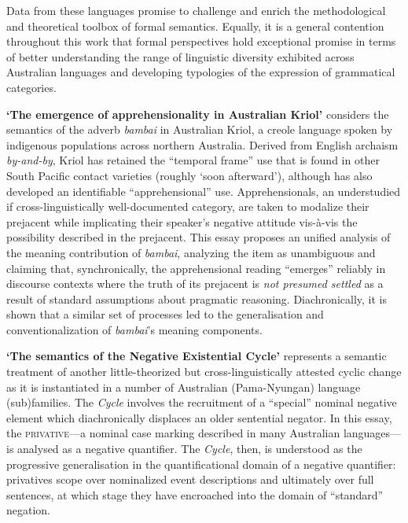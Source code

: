 {Data from these languages promise to challenge and enrich the methodological and theoretical toolbox of formal semantics. Equally, it is a general contention throughout this work that formal perspectives hold exceptional promise in terms of better understanding the range of linguistic diversity exhibited across Australian languages and developing typologies of the expression of grammatical categories.

\textbf{‘The emergence of apprehensionality in Australian Kriol’} considers the semantics of the adverb \textit{bambai} in Australian Kriol, a creole language spoken by indigenous populations across northern Australia. Derived from English archaism \textit{by-and-by}, %
Kriol has retained the ``temporal frame'' use that is found in other South Pacific contact varieties (roughly `soon afterward'), although has also developed an identifiable ``apprehensional'' use. Apprehensionals, an understudied if cross-linguistically well-documented category, are taken to modalize their prejacent while implicating their speaker's negative attitude vis-à-vis the possibility described in the prejacent. This essay proposes an unified analysis of the meaning contribution of \textit{bambai}, analyzing the item as unambiguous and claiming that, synchronically, the apprehensional reading ``emerges'' reliably in discourse contexts where the truth of its prejacent is \textit{not presumed settled} as a result of standard assumptions about pragmatic reasoning. Diachronically, it is shown that a similar set of processes led to the generalisation and conventionalization of \textit{bambai}'s meaning components.

\textbf{‘The semantics of the Negative Existential Cycle’} represents a semantic treatment of another little-theorized but cross-linguistically attested cyclic change as it is instantiated in a number of Australian (Pama-Nyungan) language (sub)families. The \textit{Cycle} involves the recruitment of a ``special'' nominal negative element which diachronically displaces an older sentential negator. In this essay, the \textsc{privative}---a nominal case marking described in many Australian languages---is analysed as a negative quantifier. The \textit{Cycle}, then, is understood as the progressive generalisation in the quantificational domain of a negative quantifier: privatives scope over nominalized event descriptions and ultimately over full sentences, at which stage they have encroached into the domain of ``standard'' negation.

}
